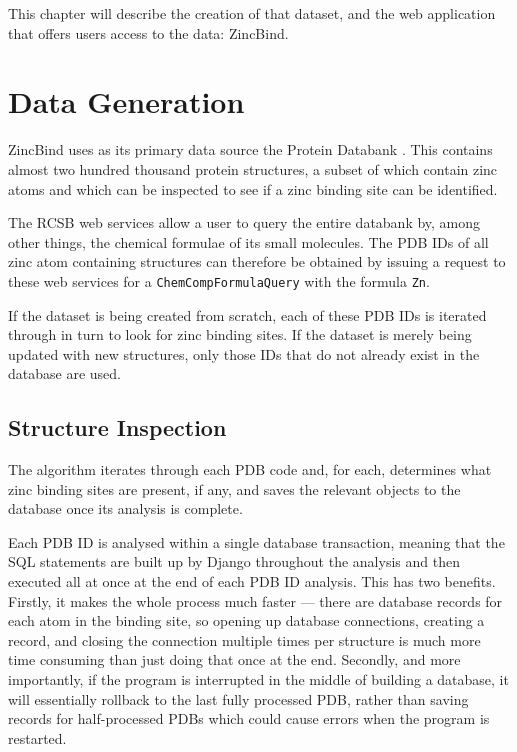 This chapter will describe the creation of that dataset, and the web application that offers users access to the data: ZincBind.

\section{Data Generation}

ZincBind uses as its primary data source the Protein Databank \cite{berman2000pdb}. This contains almost two hundred thousand protein structures, a subset of which contain zinc atoms and which can be inspected to see if a zinc binding site can be identified.

The RCSB web services \cite{burley2020pdb} allow a user to query the entire databank by, among other things, the chemical formulae of its small molecules. The PDB IDs of all zinc atom containing structures can therefore be obtained by issuing a request to these web services for a \verb|ChemCompFormulaQuery| with the formula \verb|Zn|.

If the dataset is being created from scratch, each of these PDB IDs is iterated through in turn to look for zinc binding sites. If the dataset is merely being updated with new structures, only those IDs that do not already exist in the database are used.

\subsection{Structure Inspection}

The algorithm iterates through each PDB code and, for each, determines what zinc binding sites are present, if any, and saves the relevant objects to the database once its analysis is complete.

Each PDB ID is analysed within a single database transaction, meaning that the SQL statements are built up by Django throughout the analysis and then executed all at once at the end of each PDB ID analysis. This has two benefits. Firstly, it makes the whole process much faster --- there are database records for each atom in the binding site, so opening up database connections, creating a record, and closing the connection multiple times per structure is much more time consuming than just doing that once at the end. Secondly, and more importantly, if the program is interrupted in the middle of building a database, it will essentially rollback to the last fully processed PDB, rather than saving records for half-processed PDBs which could cause errors when the program is restarted.

